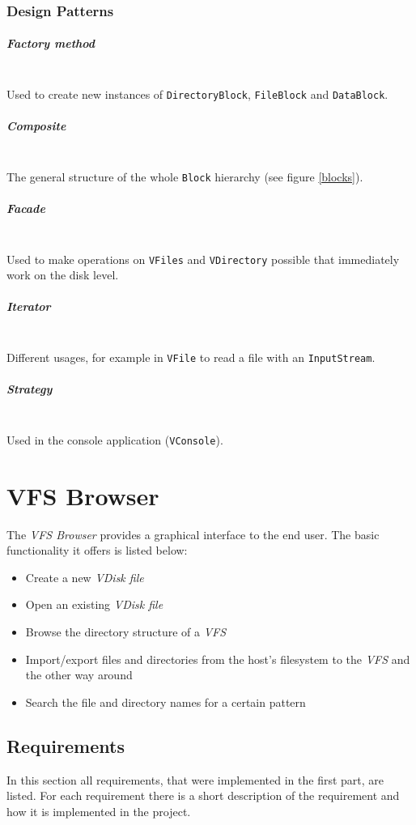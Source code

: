 \documentclass[a4paper,12pt]{article}
\begin{document}
\subsubsection{Design Patterns}
\subparagraph{Factory method} \hfill\\
Used to create new instances of \texttt{DirectoryBlock}, \texttt{FileBlock} and \texttt{DataBlock}.

\subparagraph{Composite} \hfill\\
The general structure of the whole \texttt{Block} hierarchy (see figure \ref{blocks}).

\subparagraph{Facade} \hfill\\
Used to make operations on \texttt{VFiles} and \texttt{VDirectory} possible that immediately work on the disk level.

\subparagraph{Iterator} \hfill\\
Different usages, for example in \texttt{VFile} to read a file with an \texttt{InputStream}.

\subparagraph{Strategy} \hfill\\
Used in the console application (\texttt{VConsole}).



\section{VFS Browser}


The \emph{VFS Browser} provides a graphical interface to the end user. The basic functionality it offers is listed below:
\begin{itemize}
\item Create a new \emph{VDisk file}
\item Open an existing \emph{VDisk file}
\item Browse the directory structure of a \emph{VFS}
\item Import/export files and directories from the host's filesystem to the \emph{VFS} and the other way around
\item Search the file and directory names for a certain pattern
\end{itemize}



\subsection{Requirements}
In this section all requirements, that were implemented in the first part, are listed. For each requirement there is a short description of the requirement and how it is implemented in the project.
\end{document}
